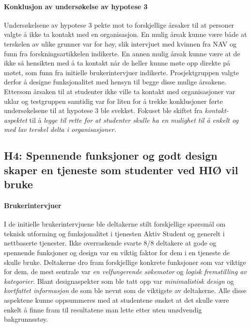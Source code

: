 \paragraph{Konklusjon av undersøkelse av hypotese 3}
Undersøkelsene av hypotese 3 pekte mot to forskjellige årsaker til at personer valgte å ikke ta kontakt med en organisasjon. En mulig årsak kunne være både at terskelen av ulike grunner var for høy, slik intervjuet med kvinnen fra NAV og funn fra forskningsartikkelen indikerte. En annen mulig årsak kunne være at de ikke så hensikten med å ta kontakt når de heller kunne møte opp direkte på møtet, som funn fra initielle brukerintervjuer indikerte. Prosjektgruppen valgte derfor å designe funksjonalitet med hensyn til begge disse mulige årsakene. Ettersom årsaken til at studenter ikke ville ta kontakt med organisasjoner var uklar og testgruppen samtidig var for liten for å trekke konklusjoner førte undersøkelsene til at hypotese 3 ble svekket. Fokuset ble skiftet fra {\em kontakt-aspektet} til å {\em legge til rette for at studenter skulle ha en mulighet til å enkelt og med lav terskel delta i organisasjoner.}


\subsection{H4: Spennende funksjoner og godt design skaper en tjeneste som studenter ved HIØ vil bruke}

\paragraph{Brukerintervjuer}
I de initielle brukerintervjuene ble deltakerne stilt forskjellige spørsmål om teknisk utforming og funksjonalitet i tjenesten Aktiv Student og generelt i nettbaserte tjenester. Ikke overraskende svarte 8/8 deltakere at gode og spennende funksjoner og design var en viktig faktor for dem i en tjeneste de skulle bruke. Deltakerne dro fram forskjellige konkrete funksjoner som var viktige for dem, de mest sentrale var {\em en velfungerende søkemotor} og {\em logisk fremstilling av kategorier}. Blant designaspekter som ble tatt opp var {\em minimalistisk design} og {\em kortfattet informasjon} de som ble nevnt som de viktigste av deltakerne. Alle disse aspektene kunne oppsummeres med at studentene ønsket at det skulle være enkelt å finne fram til resultatene man lette etter uten unødvendig bakgrunnsstøy.

